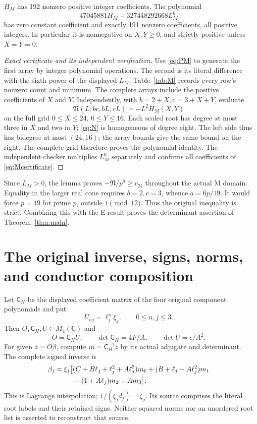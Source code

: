 \begin{lemma}\label{lem:Mpoly}
$H_M$ has 192 nonzero positive integer coefficients. The polynomial
\begin{equation}\label{eq:Mcertificate}
 47045881H_M-327448292668L_M^6
\end{equation}
has zero constant coefficient and exactly 191 nonzero coefficients, all
positive integers. In particular it is nonnegative on $X,Y\ge0$, and strictly
positive unless $X=Y=0$.
\end{lemma}
\begin{proof}[Exact certificate and its independent verification]
Use \eqref{eq:PM} to generate the first array by integer polynomial operations.
The second is its literal difference with the sixth power of the displayed
$L_M$. Table~\ref{tab:M} records every row's nonzero count and minimum.
The complete arrays include the positive coefficients of $X$ and $Y$.
Independently, with $b=2+X,c=3+X+Y$, evaluate
\[
 \mathfrak N(L,bc,bL,cL)=-L^2H_M(X,Y)
\]
on the full grid $0\le X\le24$, $0\le Y\le16$. Each scaled root has degree
at most three in $X$ and two in $Y$; \eqref{eq:N} is homogeneous of degree
eight. The left side thus has bidegree at most $(24,16)$; the array bounds give
the same bound on the right. The complete grid therefore proves the polynomial
identity. The independent checker multiplies $L_M^6$ separately and confirms
all coefficients of \eqref{eq:Mcertificate}.
\end{proof}

Since $L_M>0$, the lemma proves $-\mathfrak N/p^8\ge c_{24}$ throughout the
actual M domain. Equality in the larger real cone requires $b=2,c=3$, whence
$a=6p/19$. It would force $p=19$ for prime $p$, outside $1\pmod{12}$.
Thus the original inequality is strict. Combining this with the E result
proves the determinant assertion of Theorem~\ref{thm:main}.



\section{The original inverse, signs, norms, and conductor composition}
Let $\mathsf C_H$ be the displayed coefficient matrix of the four original
component polynomials and put
\[
 U_{nj}=\ell_j^n\xi_j,\qquad 0\le n,j\le3.
\]
Then $O,\mathsf C_H,U\in M_4(\mathbb C)$ and
\[
 O=\mathsf C_H U,\qquad
 \det\mathsf C_H=4F/A,\qquad \det U=\epsilon/A^2.
\]
For given $z=O\beta$, compute $m=\mathsf C_H^{-1}z$ by its actual adjugate and
determinant. The complete signed inverse is
\begin{align}\label{eq:inverse}
 \beta_j=\xi_j\bigl[&(C+B\ell_j+\ell_j^2+A\ell_j^3)m_0
 +(B+\ell_j+A\ell_j^2)m_1\notag\\
 &+(1+A\ell_j)m_2+A m_3\bigr].
\end{align}
This is Lagrange interpolation; $1/(\xi_jd_j)=\xi_j$. Its source comprises the
literal root labels and their retained signs. Neither squared norms nor an
unordered root list is asserted to reconstruct that source.

